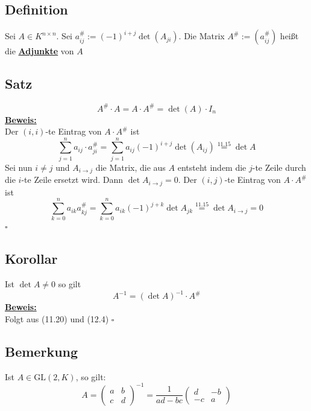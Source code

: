 \subsection{Definition} %
\label{sub:definiton}
Sei $A \in K^{n \times n}$. Sei $a_{ij}^\# := (-1)^{i+j} \det (A_{ji})$. Die Matrix $A^\# := (a_{ij}^\#)$ heißt die \textbf{\underline{Adjunkte}} von $A$

\subsection{Satz} %
\label{sub:satz}
\[
	A^\# \cdot A = A \cdot A^\# = \det(A) \cdot I_n 
\]
\underline{\textbf{Beweis:}} \\
Der $(i,i)$-te Eintrag von $A \cdot A^\#$ ist 
\[
	\sum\limits_{j=1}^{n} a_{ij} \cdot a_{ji}^\# = \sum\limits_{j=1}^{n} a_{ij} (-1)^{i+j} \det (A_{ij}) \overset{\text{11.15}}{=} \det A
\]
Sei nun $i \not= j$ und $A_{i \to j}$ die Matrix, die aus $A$ entsteht indem die $j$-te Zeile durch die $i$-te Zeile ersetzt wird. Dann 
$\det A_{i \to j} = 0$. Der $(i,j)$-te Eintrag von $A \cdot	A^\#$ ist 
\[
	\sum\limits_{k=0}^{n} a_{ik} a_{kj}^\# = \sum\limits_{k=0}^{n} a_{ik} (-1)^{j+k} \det A_{jk} \overset{11.15}{=} \det A_{i \to j} = 0  
\]
\hfill \( \square \)

\subsection{Korollar} %
\label{sub:korollar}
Ist $\det A \not= 0$ so gilt
\[
	A ^{-1} = (\det A) ^{-1} \cdot A^\#
\]
\underline{\textbf{Beweis:}} \\
Folgt aus (11.20) und (12.4) \hfill \( \square \)

\subsection{Bemerkung} %
\label{sub:bemerkung}
Ist $A \in \text{GL}(2,K)$, so gilt:
\[
	A= \begin{pmatrix}
		a & b \\
		c & d
	\end{pmatrix} ^{-1} = \frac{1}{ad-bc} \begin{pmatrix}
		d & -b \\
		-c & a
	\end{pmatrix} 
\]

